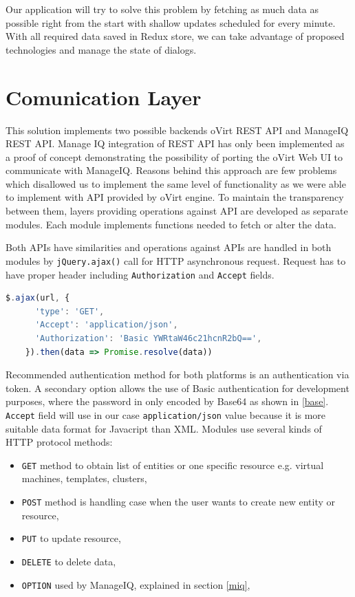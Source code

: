 Our application will try to solve this problem by fetching as much data as possible right from the start with shallow updates scheduled for every minute. With all required data saved in Redux store, we can take advantage of proposed technologies and manage the state of dialogs.

\section{Comunication Layer}
This solution implements two possible backends oVirt REST API and ManageIQ REST API. Manage IQ integration of REST API has only been implemented as a proof of concept demonstrating the possibility of porting the oVirt Web UI to communicate with ManageIQ. Reasons behind this approach are few problems which disallowed us to implement the same level of functionality as we were able to implement with API provided by oVirt engine. To maintain the transparency between them, layers providing operations against API are developed as separate modules. Each module implements functions needed to fetch or alter the data.

Both APIs have similarities and operations against APIs are handled in both modules by \texttt{jQuery.ajax()}\cite{ajax} call for HTTP asynchronous request.
Request has to have proper header including \texttt{Authorization} and \texttt{Accept} fields. 

\bigskip
\begin{lstlisting}[language=javascript,xleftmargin=3.5ex,caption={Fetching data from ManageIQ with Basic Authentication}]
$.ajax(url, {
      'type': 'GET',
      'Accept': 'application/json',
      'Authorization': 'Basic YWRtaW46c21hcnR2bQ==',
    }).then(data => Promise.resolve(data))
\end{lstlisting}\label{base}
\bigskip
  
Recommended authentication method for both platforms is an authentication via token. A secondary option allows the use of Basic authentication for development purposes, where the password in only encoded by Base64 as shown in \ref{base}.
\texttt{Accept} field will use in our case \texttt{application/json} value because it is more suitable data format for Javacript than XML. Modules use several kinds of HTTP protocol methods: 
\begin{itemize}
\item \texttt{GET} method to obtain list of entities or one specific resource e.g. virtual machines, templates, clusters,
\item \texttt{POST} method is handling case when the user wants to create new entity or resource,
\item \texttt{PUT} to update resource,
\item \texttt{DELETE} to delete data,
\item \texttt{OPTION} used by ManageIQ, explained in section \ref{miq},
\end{itemize}

